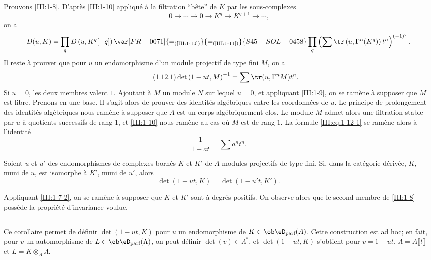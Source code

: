 Prouvons \ref{III:1-8}. D'après \ref{III:1-10} appliqué à la filtration 
``bête'' de $K$ par les sous-complexes 
\[
  0 \to \cdots \to 0 \to K^q \to K^{q+1} \to \cdots \text{,}
\]
on a 
\[
  D(u,K) = \prod_q D\left(u,K^q[-q]\right) \var[FR-0071]{=_{\text{(\ref{III:1-10})}}}{=_{\text{(\ref{III:1-11})}}}{S45-SOL-0458} \prod_q \left(\sum \tr\left(u,\Gamma^n(K^q)\right) t^n \right)^{(-1)^q} \text{.}
\]
Il reste à prouver que pour $u$ un endomorphisme d'un module projectif de type 
fini $M$, on a 
\begin{equation*}\tag{1.12.1}\label{III:eq:1-12-1}
  \det\left(1-u t,M\right)^{-1} = \sum \tr(u,\Gamma^n M) t^n \text{.}
\end{equation*}
Si $u=0$, les deux membres valent $1$. Ajoutant à $M$ un module $N$ sur lequel 
$u=0$, et appliquant \ref{III:1-9}, on se ramène à supposer que $M$ est libre. 
Prenons-en une base. Il s'agit alors de prouver des identités algébriques 
entre les coordonnées de $u$. Le principe de prolongement des identités 
algébriques nous ramène à supposer que $A$ est un corps algébriquement 
clos. Le module $M$ admet alors une filtration stable par $u$ à quotients 
successifs de rang $1$, et \ref{III:1-10} nous ramène au cas où $M$ est de 
rang $1$. La formule \eqref{III:eq:1-12-1} se ramène alors à l'identité 
\[
  \frac{1}{1-a t} = \sum a^n t^n \text{.}
\]





\begin{corollary_}\label{III:1-13}
Soient $u$ et $u'$ des endomorphismes de complexes bornés $K$ et $K'$ de 
$A$-modules projectifs de type fini. Si, dans la catégorie dérivée, $K$, 
muni de $u$, est isomorphe à $K'$, muni de $u'$, alors 
\[
  \det(1-u t,K) = \det(1-u' t,K') \text{.}
\]
\end{corollary_}

Appliquant \ref{III:1-7-2}, on se ramène à supposer que $K$ et $K'$ sont à 
degrés positifs. On observe alors que le second membre de \ref{III:1-8} 
possède la propriété d'invariance voulue. 





\subsection{}\label{III:1-14}

Ce corollaire permet de définir $\det(1-u t,K)$ pour $u$ un endomorphisme de 
$K\in \ob\eD_\text{parf}(A)$. Cette construction est ad hoc; en fait, pour $v$ un 
automorphisme de $L\in\ob\eD_\text{parf}(\Lambda)$, on peut définir 
$\det(v)\in\Lambda^*$, et $\det(1-u t,K)$ s'obtient pour $v=1-u t$, 
$\Lambda=A\llbracket t\rrbracket$ et $L=K\otimes_A\Lambda$. 










